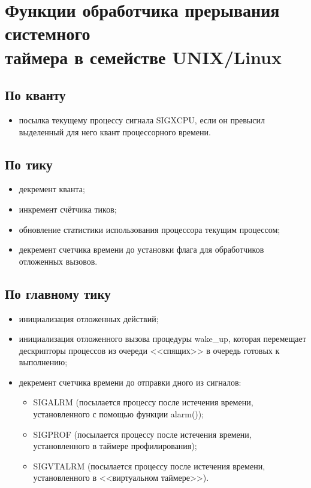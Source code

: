 \section{Функции обработчика прерывания системного \\ таймера в семействе UNIX/Linux}

\subsection*{По кванту}

\begin{itemize}[label*=--]
	\item посылка текущему процессу сигнала SIGXCPU, если он превысил выделенный для него квант процессорного времени.
\end{itemize}

\subsection*{По тику}

\begin{itemize}[label*=--]
	\item декремент кванта;
	\item инкремент счётчика тиков;
	\item обновление статистики использования процессора текущим процессом; %
	\item декремент счетчика времени до установки флага для обработчиков отложенных вызовов.
\end{itemize}

\subsection*{По главному тику}

\begin{itemize}[label*=--]
	\item инициализация отложенных действий;
	\item инициализация отложенного вызова процедуры wake\_up, которая перемещает дескрипторы процессов из очереди <<спящих>> в очередь готовых к выполнению;
	\item декремент счетчика времени до отправки дного из сигналов:
	\begin{itemize}[label=•]
		\item SIGALRM (посылается процессу после истечения времени, установленного с помощью функции alarm());
		\item SIGPROF (посылается процессу после истечения времени, установленного в таймере профилирования);
		\item SIGVTALRM (посылается процессу после истечения времени, установленного в  <<виртуальном таймере>>).
	\end{itemize}
\end{itemize}

